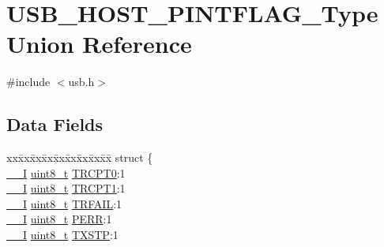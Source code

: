 \hypertarget{union_u_s_b___h_o_s_t___p_i_n_t_f_l_a_g___type}{}\section{U\+S\+B\+\_\+\+H\+O\+S\+T\+\_\+\+P\+I\+N\+T\+F\+L\+A\+G\+\_\+\+Type Union Reference}
\label{union_u_s_b___h_o_s_t___p_i_n_t_f_l_a_g___type}


{\ttfamily \#include $<$usb.\+h$>$}

\subsection*{Data Fields}
\begin{DoxyCompactItemize}
\item 
\begin{tabbing}
xx\=xx\=xx\=xx\=xx\=xx\=xx\=xx\=xx\=\kill
struct \{\\
\>\mbox{\hyperlink{core__cm0plus_8h_af63697ed9952cc71e1225efe205f6cd3}{\_\_I}} \mbox{\hyperlink{union_u_s_b___h_o_s_t___p_i_n_t_f_l_a_g___type_a5b4208c6f4c4a4290c4f2804d1eb1d5b}{uint8\_t}} \mbox{\hyperlink{union_u_s_b___h_o_s_t___p_i_n_t_f_l_a_g___type_a35abeb4415a3f78c80da9ad7b820fdc0}{TRCPT0}}:1\\
\>\mbox{\hyperlink{core__cm0plus_8h_af63697ed9952cc71e1225efe205f6cd3}{\_\_I}} \mbox{\hyperlink{union_u_s_b___h_o_s_t___p_i_n_t_f_l_a_g___type_a5b4208c6f4c4a4290c4f2804d1eb1d5b}{uint8\_t}} \mbox{\hyperlink{union_u_s_b___h_o_s_t___p_i_n_t_f_l_a_g___type_a96d54fd41ad99b8c9b4d7af4e1acf14d}{TRCPT1}}:1\\
\>\mbox{\hyperlink{core__cm0plus_8h_af63697ed9952cc71e1225efe205f6cd3}{\_\_I}} \mbox{\hyperlink{union_u_s_b___h_o_s_t___p_i_n_t_f_l_a_g___type_a5b4208c6f4c4a4290c4f2804d1eb1d5b}{uint8\_t}} \mbox{\hyperlink{union_u_s_b___h_o_s_t___p_i_n_t_f_l_a_g___type_aa3e11ee6462bfc034721044e1fb311f0}{TRFAIL}}:1\\
\>\mbox{\hyperlink{core__cm0plus_8h_af63697ed9952cc71e1225efe205f6cd3}{\_\_I}} \mbox{\hyperlink{union_u_s_b___h_o_s_t___p_i_n_t_f_l_a_g___type_a5b4208c6f4c4a4290c4f2804d1eb1d5b}{uint8\_t}} \mbox{\hyperlink{union_u_s_b___h_o_s_t___p_i_n_t_f_l_a_g___type_a35d1d3d3d464f902d3910be5b7ded7fa}{PERR}}:1\\
\>\mbox{\hyperlink{core__cm0plus_8h_af63697ed9952cc71e1225efe205f6cd3}{\_\_I}} \mbox{\hyperlink{union_u_s_b___h_o_s_t___p_i_n_t_f_l_a_g___type_a5b4208c6f4c4a4290c4f2804d1eb1d5b}{uint8\_t}} \mbox{\hyperlink{union_u_s_b___h_o_s_t___p_i_n_t_f_l_a_g___type_ad7b5bb61a232d52e858752038efc23d7}{TXSTP}}:1\\

\end{tabbing}
\end{DoxyCompactItemize}

